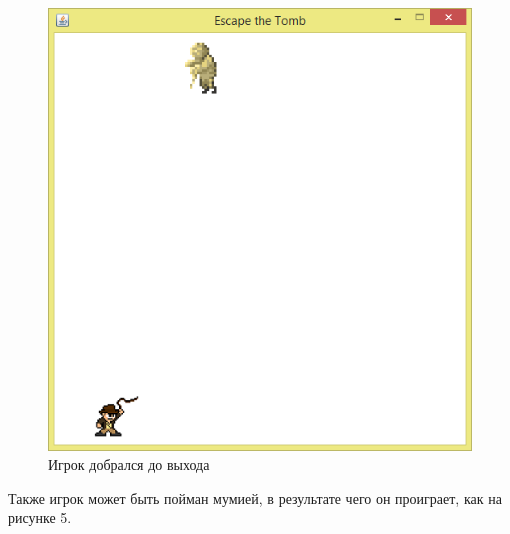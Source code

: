\begin{figure}[H]
	\begin{center}
		\includegraphics[scale=0.7]{image/field3.png}
		\caption{Игрок добрался до выхода} 
		\label{pic:pic_name} %
	\end{center}
\end{figure}

Также игрок может быть пойман мумией, в результате чего он проиграет, как на рисунке 5.

